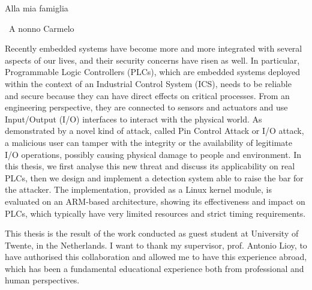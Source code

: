 \documentclass[pdfa,cucitura]{toptesi}
\begin{document}

\TesiDiLaurea{}










\frontespizio
\paginavuota
\newpage

\advance\voffset -5mm
\advance\textheight 30mm


\begin{dedica}
Alla mia famiglia

\textdagger\ A nonno Carmelo
\end{dedica}


\sommario

Recently embedded systems have become more and more integrated with several aspects of our lives, and their security concerns have risen as well.
In particular, Programmable Logic Controllers (PLCs), which are embedded systems deployed within the context of an Industrial Control System (ICS),
needs to be reliable and secure because they can have direct effects on critical processes.
From an engineering perspective, they are connected to sensors and actuators and use Input/Output (I/O) interfaces to interact with the physical world.
As demonstrated by a novel kind of attack, called Pin Control Attack or I/O attack, a malicious user can tamper with the integrity or
the availability of legitimate I/O operations, possibly causing physical damage to people and environment.
In this thesis, we first analyse this new threat and discuss its applicability on real PLCs, then we design and implement a detection system able to raise the bar for the attacker.
The implementation, provided as a Linux kernel module, is evaluated on an ARM-based architecture,
showing its effectiveness and impact on PLCs, which typically have very limited resources and strict timing requirements.


\ringraziamenti

This thesis is the result of the work conducted as guest student at University of Twente, in the Netherlands. I want to thank my supervisor, prof. Antonio Lioy,
to have authorised this collaboration and allowed me to have this experience abroad, which has been a fundamental educational experience both from professional and human perspectives.
\end{document}

